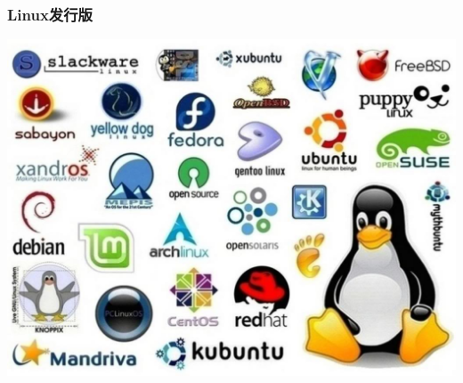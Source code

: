 \documentclass[xcolor=svgnames,bigger,presentation]{beamer}
\begin{document}
\begin{frame}
\frametitle{Linux发行版}
\label{sec-2-3-7}

\begin{center}
\includegraphics[width=.9\linewidth]{img/distri.jpg}
\end{center}
\end{frame}
\end{document}
